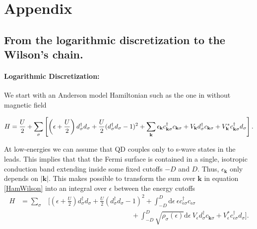 \chapter{Appendix}

\section{From the logarithmic discretization to the Wilson's chain.\label{sec:LogarithmicDisc}}

\subsubsection{Logarithmic Discretization:}

We start with an Anderson model Hamiltonian such as the one 
in  without magnetic field

\begin{equation}
H=\frac{U}{2}+\sum_{\sigma}\left[\left(\epsilon+\frac{U}{2}\right)d_{\sigma}^{\dagger}d_{\sigma}+\frac{U}{2}(d_{\sigma}^{\dagger}d_{\sigma}-1)^{2}+\sum_{\mathbf{k}}\epsilon_{\mathbf{k}}c_{\mathbf{k}\sigma}^{\dagger}c_{\mathbf{k}\sigma}+V_{\mathbf{k}}d_{\sigma}^{\dagger}c_{\mathbf{k}\sigma}+V_{\mathbf{k}}^{*}c_{\mathbf{k}\sigma}^{\dagger}d_{\sigma}\right].\label{HamWilson}
\end{equation}

At low-energies we can assume that QD couples only to s-wave states in the leads\citep{krishna-murthy_renormalization-group_1980}. This implies that that the Fermi surface is contained
in a single, isotropic conduction band extending inside some fixed cutoffs $-D$ and $D$. Thus, $\epsilon_{\mathbf{k}}$ only depends on $\left|\mathbf{k}\right|$. This makes possible to transform the sum over $\mathbf{k}$ in
equation \ref{HamWilson} into an integral over $\epsilon$ between
the energy cutoffs
\begin{eqnarray}
H & =\sum_{\sigma} & \Biggl[\left(\epsilon+\frac{U}{2}\right)d_{\sigma}^{\dagger}d_{\sigma}+\frac{U}{2}(d_{\sigma}^{\dagger}d_{\sigma}-1)^{2}+\int_{-D}^{D}\mbox{d}\epsilon\ \epsilon c_{\epsilon\sigma}^{\dagger}c_{\epsilon\sigma}\nonumber \\
 &  & \qquad\qquad\qquad\qquad\qquad\qquad+\int_{-D}^{D}\sqrt{\rho_{\sigma}(\epsilon)}\mbox{d}\epsilon\ V_{\epsilon}d_{\sigma}^{\dagger}c_{\mathbf{k}\sigma}+V_{\epsilon}^{*}c_{\epsilon\sigma}^{\dagger}d_{\sigma}\Biggr].\label{eq:hamEnergy}
\end{eqnarray}


